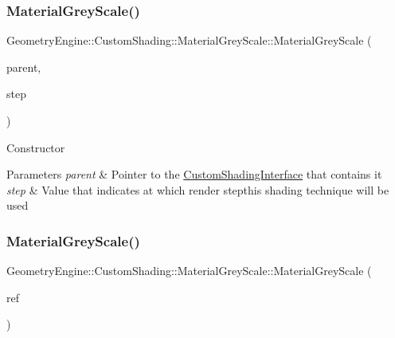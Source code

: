 \subsubsection{\texorpdfstring{MaterialGreyScale()}{MaterialGreyScale()}\hspace{0.1cm}{\footnotesize\ttfamily [1/2]}}
{\footnotesize\ttfamily Geometry\+Engine\+::\+Custom\+Shading\+::\+Material\+Grey\+Scale\+::\+Material\+Grey\+Scale (\begin{DoxyParamCaption}\item[{\mbox{\hyperlink{class_geometry_engine_1_1_custom_shading_1_1_material_post_process_interface}{Material\+Post\+Process\+Interface}} $\ast$}]{parent,  }\item[{\mbox{\hyperlink{namespace_geometry_engine_1_1_custom_shading_af8b09b91ca7086f4f67a5d4181f35e58}{Material\+Post\+Process\+Steps}}}]{step }\end{DoxyParamCaption})\hspace{0.3cm}{\ttfamily [inline]}}

Constructor 
\begin{DoxyParams}{Parameters}
{\em parent} & Pointer to the \mbox{\hyperlink{class_geometry_engine_1_1_custom_shading_1_1_custom_shading_interface}{Custom\+Shading\+Interface}} that contains it \\
\hline
{\em step} & Value that indicates at which render stepthis shading technique will be used \\
\hline
\end{DoxyParams}
\mbox{\label{class_geometry_engine_1_1_custom_shading_1_1_material_grey_scale_abab5bea6ddcb2ad41aea9860f6b5c9d2}} 
\subsubsection{\texorpdfstring{MaterialGreyScale()}{MaterialGreyScale()}\hspace{0.1cm}{\footnotesize\ttfamily [2/2]}}
{\footnotesize\ttfamily Geometry\+Engine\+::\+Custom\+Shading\+::\+Material\+Grey\+Scale\+::\+Material\+Grey\+Scale (\begin{DoxyParamCaption}\item[{const \mbox{\hyperlink{class_geometry_engine_1_1_custom_shading_1_1_material_grey_scale}{Material\+Grey\+Scale}} \&}]{ref }\end{DoxyParamCaption})\hspace{0.3cm}{\ttfamily [inline]}}

